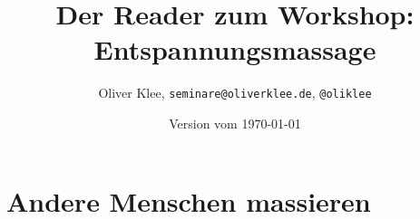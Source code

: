 \documentclass[a4paper,twoside,11pt,titlepage,openany]{scrbook}
\author{Oliver Klee, \texttt{seminare@oliverklee.de}, \texttt{@oliklee}}
\title{Der Reader zum Workshop: Entspannungsmassage}
\date{Version vom \today}
\begin{document}
\nocite*{}

\maketitle
\frontmatter




\tableofcontents

\mainmatter



\chapter{Andere Menschen massieren}









\backmatter

\end{document}
